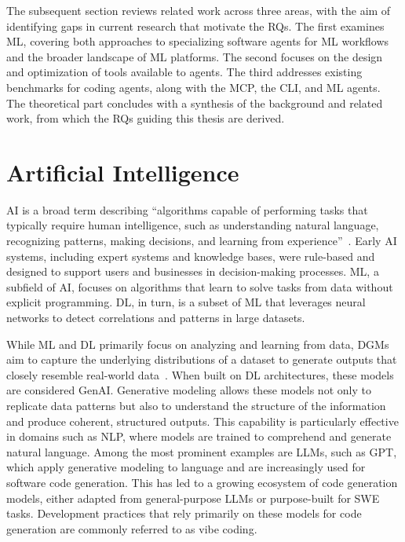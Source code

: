 \documentclass[
english,                 %
bibtex,                  %
includeExtraAbstracts, %
]{kththesis}
\numberwithin{listing}{chapter}
\begin{document}
The subsequent section reviews related work across three areas, with the aim of identifying gaps in current research that motivate the \glspl{RQ}. The first examines \gls{ML}, covering both approaches to specializing software agents for \gls{ML} workflows and the broader landscape of \gls{ML} platforms. The second focuses on the design and optimization of tools available to agents. The third addresses existing benchmarks for coding agents, along with the \gls{MCP}, the \gls{CLI}, and \gls{ML} agents. The theoretical part concludes with a synthesis of the background and related work, from which the \glspl{RQ} guiding this thesis are derived.

\section{Artificial Intelligence}
\glsresetall

\Gls{AI} is a broad term describing “algorithms capable of performing tasks that typically require human intelligence, such as understanding natural language, recognizing patterns, making decisions, and learning from experience”~\cite{banh_generative_2023}. Early \gls{AI} systems, including expert systems and knowledge bases, were rule-based and designed to support users and businesses in decision-making processes. \Gls{ML}, a subfield of \gls{AI}, focuses on algorithms that learn to solve tasks from data without explicit programming. \Gls{DL}, in turn, is a subset of \gls{ML} that leverages neural networks to detect correlations and patterns in large datasets.

While \gls{ML} and \gls{DL} primarily focus on analyzing and learning from data, \glspl{DGM} aim to capture the underlying distributions of a dataset to generate outputs that closely resemble real-world data~\cite{banh_generative_2023}. When built on \gls{DL} architectures, these models are considered \gls{GenAI}. Generative modeling allows these models not only to replicate data patterns but also to understand the structure of the information and produce coherent, structured outputs. This capability is particularly effective in domains such as \gls{NLP}, where models are trained to comprehend and generate natural language. Among the most prominent examples are \glspl{LLM}, such as \gls{GPT}, which apply generative modeling to language and are increasingly used for software code generation. This has led to a growing ecosystem of code generation models, either adapted from general-purpose \glspl{LLM} or purpose-built for \gls{SWE} tasks. Development practices that rely primarily on these models for code generation are commonly referred to as vibe coding.
\end{document}
